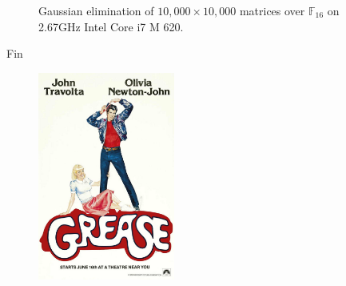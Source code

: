 \documentclass[11pt]{beamer}
\newcommand{\field}[1]{\mathbb{#1}}
\newcommand{\F}{\ensuremath{\field{F}}\xspace}
\begin{document}
\begin{frame}[fragile]
\begin{figure}[htbp]
\begin{center}
\begin{tikzpicture}[xscale=0.035,yscale=0.2]
\end{tikzpicture}
\caption{Gaussian elimination of $10,000 \times 10,000$ matrices over $\F_{16}$ on 2.67GHz Intel Core i7 M 620.}
\label{fig:sparse-m4rie}
\end{center}
\end{figure}
\end{frame}

\begin{frame}{Fin}
\begin{figure}[h]
 \centering
 \includegraphics[width=0.4\textwidth]{./grease.jpg}
\end{figure}

\begin{center}

\end{center}

\end{frame}

\begin{frame}[allowframebreaks]


\end{frame}
\end{document}
